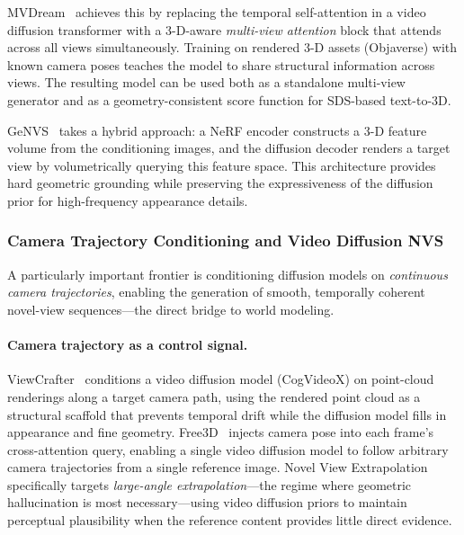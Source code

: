 MVDream~\citep{shi2023mvdream} achieves this by replacing the temporal
self-attention in a video diffusion transformer with a 3-D-aware \emph{multi-view
attention} block that attends across all views simultaneously.
Training on rendered 3-D assets (Objaverse) with known camera poses teaches the
model to share structural information across views.
The resulting model can be used both as a standalone multi-view generator and
as a geometry-consistent score function for SDS-based text-to-3D.

GeNVS~\citep{chan2023genvs} takes a hybrid approach: a NeRF encoder constructs
a 3-D feature volume from the conditioning images, and the diffusion decoder
renders a target view by volumetrically querying this feature space.
This architecture provides hard geometric grounding while preserving the
expressiveness of the diffusion prior for high-frequency appearance details.

\subsubsection{Camera Trajectory Conditioning and Video Diffusion NVS}

A particularly important frontier is conditioning diffusion models on
\emph{continuous camera trajectories}, enabling the generation of smooth,
temporally coherent novel-view sequences---the direct bridge to world modeling.

\paragraph{Camera trajectory as a control signal.}
ViewCrafter~\citep{yu2024viewcrafter} conditions a video diffusion model
(CogVideoX) on point-cloud renderings along a target camera path, using
the rendered point cloud as a structural scaffold that prevents temporal
drift while the diffusion model fills in appearance and fine geometry.
Free3D~\citep{zheng2023free3d} injects camera pose into each frame's
cross-attention query, enabling a single video diffusion model to follow
arbitrary camera trajectories from a single reference image.
Novel View Extrapolation~\citep{shi2024nve} specifically targets
\emph{large-angle extrapolation}---the regime where geometric hallucination
is most necessary---using video diffusion priors to maintain perceptual
plausibility when the reference content provides little direct evidence.

